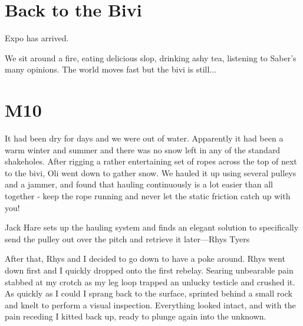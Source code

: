 \section{Back to the Bivi}
Expo has arrived. 

\begin{marginfigure}
\end{marginfigure}

We sit around a fire, eating delicious slop, drinking ashy tea, listening  to Saber's many opinions. The world moves fast but the bivi is still...

\section{M10}
It had been dry for days and we were out of water. Apparently it had been a warm winter and summer and there was no snow left in any of the standard shakeholes. After rigging a rather entertaining set of ropes across the top of  next to the bivi, Oli went down to gather snow. We hauled it up using several pulleys and a jammer, and found that hauling continuously is a lot easier than all together - keep the rope running and never let the static friction catch up with you!

\begin{marginfigure}
\checkoddpage \ifoddpage \forcerectofloat \else \forceversofloat \fi
\centering
 \caption{Jack Hare sets up the hauling system and finds an elegant solution to specifically send the pulley out over the pitch and retrieve it later---Rhys Tyers}
 \label{near sump}
\end{marginfigure}

After that, Rhys and I decided to go down to have a poke around. Rhys went down first and I quickly dropped onto the first rebelay. Searing unbearable pain stabbed at my crotch as my leg loop trapped an unlucky testicle and crushed it. As quickly as I could I sprang back to the surface, sprinted behind a small rock and knelt to perform a visual inspection. Everything looked intact, and with the pain receding I kitted back up, ready to plunge again into the unknown.

